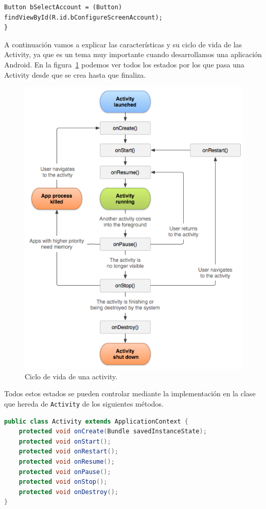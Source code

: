 \begin{itemize}
\begin{lstlisting}[style=Java]
	Button bSelectAccount = (Button) findViewById(R.id.bConfigureScreenAccount);
}
\end{lstlisting}

A continuación vamos a explicar las características y su ciclo de vida de las Activity, ya que es un tema muy importante cuando desarrollamos una aplicación Android. En la figura~\ref{fig:cicloActivity} podemos ver todos los estados por los que pasa una Activity desde que se crea hasta que finaliza. 

\begin{figure}
  \centering
    \includegraphics[scale=0.8]{./Android/imagenes/cicloActivity.png}
  \caption{Ciclo de vida de una activity.}
  \label{fig:cicloActivity}
\end{figure}

Todos estos estados se pueden controlar mediante la implementación en la clase que hereda de \lstinline{Activity} de los siguientes métodos.

\begin{lstlisting}[language=Java]
public class Activity extends ApplicationContext {
	protected void onCreate(Bundle savedInstanceState);
	protected void onStart();
	protected void onRestart();
	protected void onResume();
	protected void onPause();
	protected void onStop();
	protected void onDestroy();
}
\end{lstlisting}


\end{itemize}
